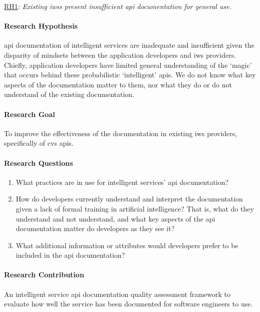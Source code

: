 \begin{titled-frame}{\underline{RH1}: \textit{Existing \glspl{iws} present insufficient \gls{api} documentation for general use.} }
\label{rh1}
\vspace{-12pt}
\paragraph{Research Hypothesis}
\gls{api} documentation of intelligent services are inadequate and insufficient given the disparity of mindsets between the application developers and \gls{iws} providers. Chiefly, application developers have limited general understanding of the `magic' that occurs behind these probabilistic `intelligent' \glspl{api}. We do not know what key aspects of the documentation matter to them, nor what they do or do not understand of the existing documentation.

\paragraph{Research Goal}
To improve the effectiveness of the documentation in existing \gls{iws} providers, specifically of \gls{cvs} \glspl{api}.

\paragraph{Research Questions}
\begin{enumerate}[label=\textbf{RQ1.\arabic*.}, ref=RQ1.\arabic*, leftmargin=3.5\parindent, rightmargin=1\parindent]
  \item What practices are in use for intelligent services' \gls{api} documentation? 
  \label{rqs:apidoc:what-is-in-use}
  
  \item How do developers currently understand and interpret the documentation given a lack of formal training in artificial intelligence? That is, what do they understand and not understand, and what key aspects of the \gls{api} documentation matter do developers as they see it?
  \label{rqs:apidoc:how-do-devs-understand-it}
  
  \item What additional information or attributes would developers prefer to be included in the \gls{api} documentation?
  \label{rqs:apidoc:what-additional-information-needed}
\end{enumerate}

\paragraph{Research Contribution} An intelligent service \gls{api} documentation quality assessment framework to evaluate how well the service has been documented for software engineers to use.

\end{titled-frame}


